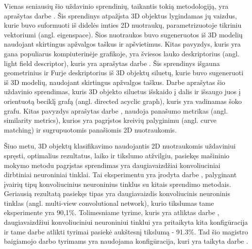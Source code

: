 Vienas seniausių šio uždavinio sprendinių, taikantis tokią metodologiją, yra aprašytas darbe \cite{prevWparEig}. Šis sprendinys atpažįsta 3D objektus lygindamas jų vaizdus, kurie buvo suformuoti iš didelės imties 2D nuotraukų, parametrizuotoje tikriniu vektoriumi (angl. eigenspace). Šios nuotraukos buvo sugeneruotos iš 3D modelių naudojant skirtingus apžvalgos taškus ir apšvietimus. Kitas pavyzdys, kuris yra gana populiarus kompiuterinėje grafikoje, yra šviesos lauko deskriptorius (angl. light field descriptor), kuris yra aprašytas darbe \cite{prevWLightFld}. Šis sprendinys išgauna geometrinius ir Furje deskriptorius iš 3D objektų siluetų, kurie buvo sugeneruoti iš 3D modelių, naudojant skirtingus apžvalgos taškus. Darbe \cite{prevWShockGraph} aprašytas šio uždavinio sprendimas, kuris 3D objekto siluetus išskaido į dalis ir išsaugo juos į orientuotą beciklį grafą (angl. directed acyclic graph), kuris yra vadinamas šoko grafu. Kitas pavyzdys aprašytas darbe \cite{prevWSimMet}, naudoja panašumo metrikas (angl. similarity metrics), kurios yra pagrįstos kreivių palyginimu (angl. curve matching) ir sugrupuotomis panašiomis 2D nuotraukomis.

Šiuo metu, 3D objektų klasifikavimo naudojantis 2D nuotraukomis uždaviniui spręsti, optimalius rezultatus, laiko ir tikslumo atžvilgiu, pasiekęs mašininio mokymo metodu pagrįstas sprendimas yra daugiavaizdžiai konvoliuciniai dirbtiniai neuroniniai tinklai. Tai eksperimentu yra įrodyta darbe \cite{cnnExp1}, palyginant įvairių tipų konvoliucinius neuroninius tinklus su kitais sprendimo metodais. Geriausią rezultatą pasiekęs tipas yra daugiavaizdis konvoliucinis neuroninis tinklas (angl. multi-view convolutional network), kurio tikslumas tame eksperimente yra 90,1\%. Tolimesniame tyrime, kuris yra atliktas darbe \cite{cnnExp2}, daugiavaizdžiui konvoliuciniui neuroniniui tinklui yra pritaikyta kita konfigūracija ir tame darbe atlikti tyrimai pasiekė aukštesnį tikslumą - 91.3\%. Tad šio magistro baigiamojo darbo tyrimams yra naudojama konfigūracija, kuri yra taikyta darbe \cite{cnnExp2}.